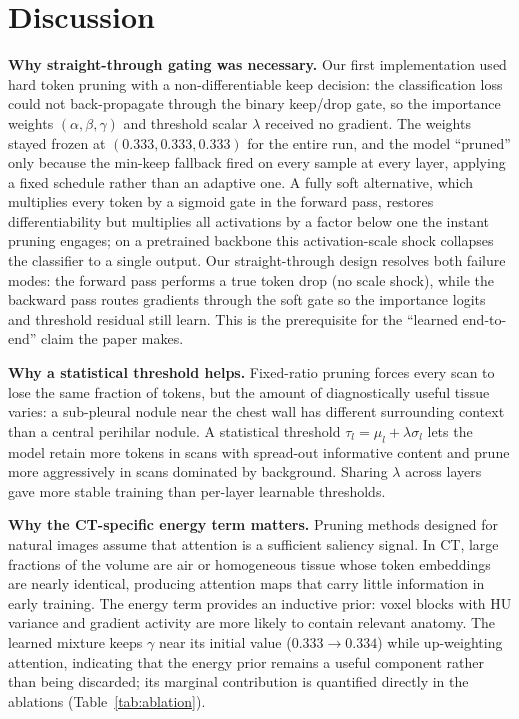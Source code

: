 \documentclass[journal]{IEEEtran}
\begin{document}
\section{Discussion}\label{sec:discussion}

\textbf{Why straight-through gating was necessary.} Our first implementation
used hard token pruning with a non-differentiable keep decision: the
classification loss could not back-propagate through the binary keep/drop
gate, so the importance weights $(\alpha,\beta,\gamma)$ and threshold scalar
$\lambda$ received no gradient. The weights stayed frozen at
$(0.333, 0.333, 0.333)$ for the entire run, and the model ``pruned'' only
because the min-keep fallback fired on every sample at every layer, applying
a fixed schedule rather than an adaptive one. A fully soft alternative, which
multiplies every token by a sigmoid gate in the forward pass, restores
differentiability but multiplies all activations by a factor below one the
instant pruning engages; on a pretrained backbone this activation-scale shock
collapses the classifier to a single output. Our straight-through design
resolves both failure modes: the forward pass performs a true token drop
(no scale shock), while the backward pass routes gradients through the soft
gate so the importance logits and threshold residual still learn. This is the
prerequisite for the ``learned end-to-end'' claim the paper makes.

\textbf{Why a statistical threshold helps.} Fixed-ratio pruning forces every
scan to lose the same fraction of tokens, but the amount of diagnostically
useful tissue varies: a sub-pleural nodule near the chest wall has different
surrounding context than a central perihilar nodule. A statistical threshold
$\tau_l = \mu_l + \lambda \sigma_l$ lets the model retain more tokens in
scans with spread-out informative content and prune more aggressively in
scans dominated by background. Sharing $\lambda$ across layers gave more
stable training than per-layer learnable thresholds.

\textbf{Why the CT-specific energy term matters.} Pruning methods designed for
natural images assume that attention is a sufficient saliency signal. In CT,
large fractions of the volume are air or homogeneous tissue whose token
embeddings are nearly identical, producing attention maps that carry little
information in early training. The energy term provides an inductive prior:
voxel blocks with HU variance and gradient activity are more likely to contain
relevant anatomy. The learned mixture keeps $\gamma$ near its initial value
($0.333 \to 0.334$) while up-weighting attention, indicating that the energy
prior remains a useful component rather than being discarded; its marginal
contribution is quantified directly in the ablations
(Table~\ref{tab:ablation}).
\end{document}
